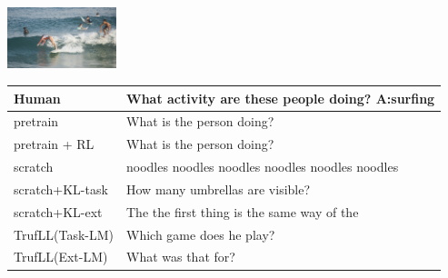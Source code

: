 \documentclass{article}
\newcommand{\algo}{TrufLL\xspace}
\begin{document}
\begin{table}[t!]
   \begin{minipage}{0.2\linewidth}
        \includegraphics[width=120px]{./COCO_val2014_000000216096.jpeg}
	\end{minipage}
	\hspace{1.2cm}
	\begin{minipage}{0.80\linewidth}
		\scriptsize
		\begin{tabular}{ll}
			Human           & What activity are these people doing?  \quad \textbf{A:surfing} \\
			\midrule
			pretrain        & What is the person doing? \\
		    pretrain + RL   & What is the person doing? \\ \midrule
			scratch         & noodles noodles noodles noodles noodles noodles  \\
			scratch+KL-task & How many umbrellas are visible? \\
			scratch+KL-ext  & The the first thing is the same way of the\\ \midrule
			\algo(Task-LM) & Which game does he play? \\
			\algo(Ext-LM)   & What was that for? \\
			\bottomrule
		\end{tabular}
	\end{minipage}
	\vspace{1mm}


\end{table}
\end{document}
